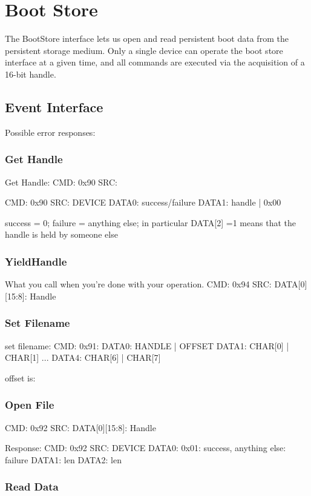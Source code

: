 \section{Boot Store}

The BootStore interface lets us open and read persistent boot data
from the persistent storage medium. Only a single device can operate
the boot store interface at a given time, and all commands are
executed via the acquisition of a 16-bit handle.

\subsection{Event Interface}

Possible error responses: 



\subsubsection{Get Handle}

Get Handle: 
CMD: 0x90
SRC: 

\response
CMD: 0x90
SRC: DEVICE
DATA0: success/failure
DATA1: handle | 0x00

success = 0; failure = anything else; 
in particular DATA[2] =1 means that the handle is held 
by someone else


\subsubsection{YieldHandle}
What you call when you're done with your operation. 
CMD: 0x94
SRC: 
DATA[0][15:8]: Handle

\subsubsection{Set Filename}
set filename: 
CMD: 0x91:
DATA0: HANDLE | OFFSET
DATA1:  CHAR[0] | CHAR[1]
...
DATA4:  CHAR[6] | CHAR[7]

offset is: 

\subsubsection{Open File} 
CMD: 0x92
SRC: 
DATA[0][15:8]: Handle

Response: 
CMD: 0x92
SRC: DEVICE
DATA0: 0x01: success, anything else: failure
DATA1: len
DATA2: len

\subsubsection{Read Data}

